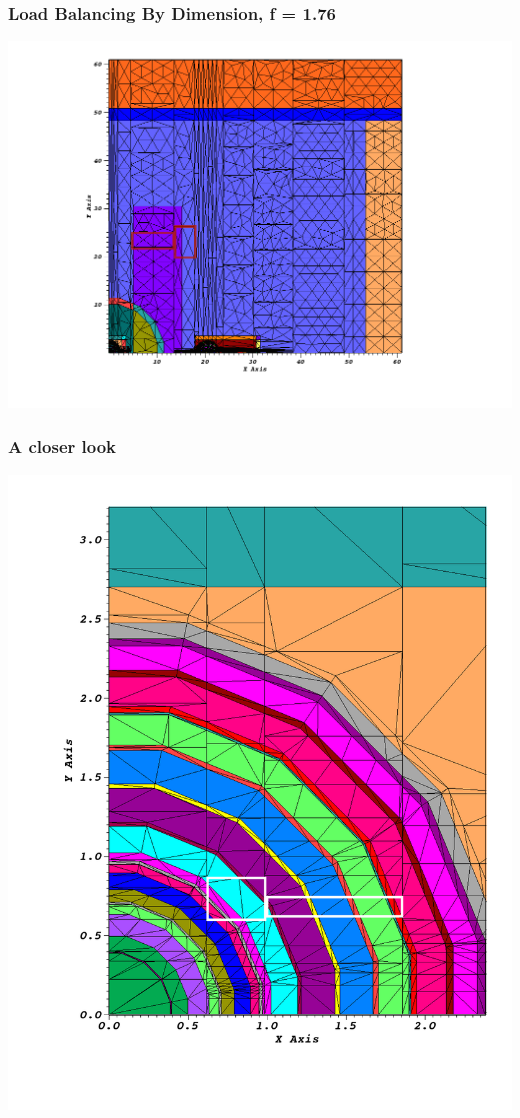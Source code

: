 \documentclass[compress]{beamer}
\begin{document}
\begin{frame}[t]\frametitle{Load Balancing By Dimension, f = 1.76}
\centering
\includegraphics[scale=0.33]{figures/IM1_new_load_balance.png}
\end{frame}

\begin{frame}[t]\frametitle{A closer look}
\centering
\includegraphics[scale=0.19]{figures/IM1_new_load_balance_zoom.png}
\end{frame}
\end{document}
